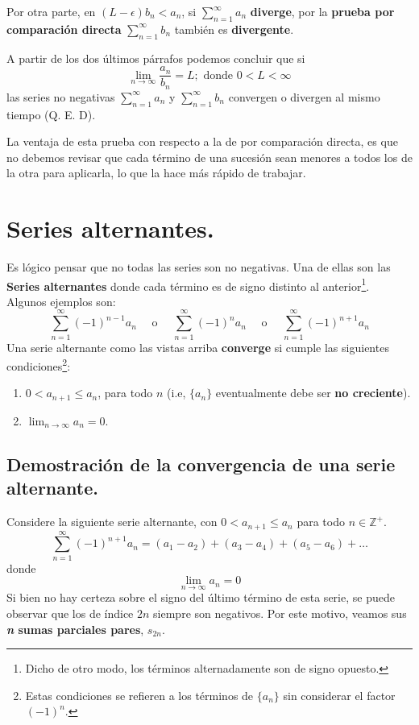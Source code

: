 \documentclass[12pt]{article}
\begin{document}
Por otra parte, en $(L - \epsilon) b_{n} < a_{n}$, si $\sum_{n = 1}^{\infty} a_{n}$ \textbf{diverge}, por la \textbf{prueba por comparación directa} $\sum_{n = 1}^{\infty} b_{n}$ también es \textbf{divergente}.

A partir de los dos últimos párrafos podemos concluir que si
\[
  \lim_{n \to \infty} \frac{a_{n}}{b_{n}} = L; \text{ donde } 0 < L < \infty
\]
las series no negativas $\sum_{n = 1}^{\infty} a_{n}$ y $\sum_{n = 1}^{\infty} b_{n}$ convergen o divergen al mismo tiempo (Q. E. D).

La ventaja de esta prueba con respecto a la de por comparación directa, es que no debemos revisar que cada término de una sucesión sean menores a todos los de la otra para aplicarla, lo que la hace más rápido de trabajar.


\section{Series alternantes.}

Es lógico pensar que no todas las series son no negativas. Una de ellas son las \textbf{Series alternantes} donde cada término es de signo distinto al anterior\footnote{Dicho de otro modo, los términos alternadamente son de signo opuesto.}. Algunos ejemplos son:
\[
  \sum_{n = 1}^{\infty} (-1)^{n - 1} a_{n} \quad \text{ o } \quad
  \sum_{n = 1}^{\infty} (-1)^{n} a_{n} \quad \text{ o } \quad
  \sum_{n = 1}^{\infty} (-1)^{n + 1} a_{n}
\]
Una serie alternante como las vistas arriba \textbf{converge} si cumple las siguientes condiciones\footnote{Estas condiciones se refieren a los términos de $\{a_{n}\}$ sin considerar el factor $(-1)^{n}$.}:

\begin{enumerate}
\item $0 < a_{n + 1} \leq a_{n}$, para todo $n$ (i.e, $\{a_{n}\}$ eventualmente debe ser \textbf{no creciente}).
\item $\displaystyle \lim_{n \to \infty} a_{n} = 0$.
\end{enumerate}

\subsection{Demostración de la convergencia de una serie alternante.}

Considere la siguiente serie alternante, con $0 < a_{n + 1} \leq a_{n}$ para todo $n \in \mathbb{Z}^{+}$.
\[
  \sum_{n = 1}^{\infty} (-1)^{n + 1} a_{n} = (a_{1} - a_{2}) + (a_{3} - a_{4}) + (a_{5} - a_{6}) + \ldots
\]
donde
\[
  \lim_{n \to \infty} a_{n} = 0
\]
Si bien no hay certeza sobre el signo del último término de esta serie, se puede observar que los de índice $2n$ siempre son negativos. Por este motivo, veamos sus \textbf{\textit{n} sumas parciales pares}, $s_{2n}$.
\end{document}
